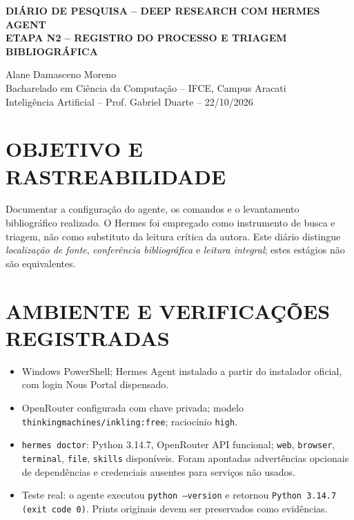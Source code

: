 \documentclass[article,12pt,oneside,a4paper,english,brazil,sumario=tradicional]{abntex2}
\begin{document}
\frenchspacing
\thispagestyle{empty}
\begin{center}
\uppercase{\bfseries Diário de Pesquisa -- Deep Research com Hermes Agent}\\[7pt]
\uppercase{\bfseries Etapa N2 -- Registro do processo e triagem bibliográfica}
\end{center}
\begin{flushright}
Alane Damasceno Moreno\\
{\small Bacharelado em Ciência da Computação -- IFCE, Campus Aracati}\\
{\small Inteligência Artificial -- Prof. Gabriel Duarte -- 22/10/2026}
\end{flushright}
\section{OBJETIVO E RASTREABILIDADE}

Documentar a configuração do agente, os comandos e o levantamento bibliográfico realizado. O Hermes foi empregado como instrumento de busca e triagem, não como substituto da leitura crítica da autora. Este diário distingue \textit{localização de fonte}, \textit{conferência bibliográfica} e \textit{leitura integral}; estes estágios não são equivalentes.
\section{AMBIENTE E VERIFICAÇÕES REGISTRADAS}
\begin{itemize}\setlength{\itemsep}{0pt}
\item Windows PowerShell; Hermes Agent instalado a partir do instalador oficial, com login Nous Portal dispensado.
\item OpenRouter configurada com chave privada; modelo \texttt{thinkingmachines/inkling:free}; raciocínio \texttt{high}.
\item \texttt{hermes doctor}: Python 3.14.7, OpenRouter API funcional; \texttt{web}, \texttt{browser}, \texttt{terminal}, \texttt{file}, \texttt{skills} disponíveis. Foram apontadas advertências opcionais de dependências e credenciais ausentes para serviços não usados.
\item Teste real: o agente executou \texttt{python --version} e retornou \texttt{Python 3.14.7 (exit code 0)}. Prints originais devem ser preservados como evidências.
\end{itemize}
\end{document}
